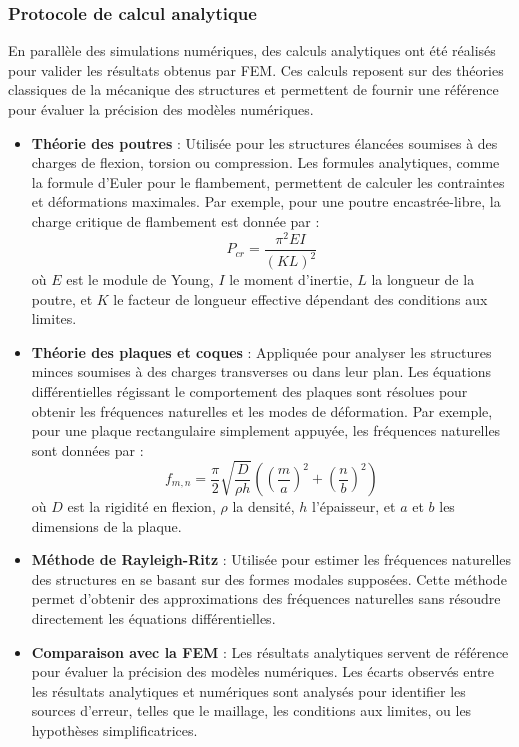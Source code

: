 \subsubsection{Protocole de calcul analytique}

En parallèle des simulations numériques, des calculs analytiques ont été réalisés pour 
valider les résultats obtenus par \acrshort{FEM}. Ces calculs reposent sur des théories 
classiques de la mécanique des structures et permettent de fournir une référence pour 
évaluer la précision des modèles numériques.

\begin{itemize}
    \item \textbf{Théorie des poutres} :
    Utilisée pour les structures élancées soumises à des charges de flexion, torsion ou 
    compression. Les formules analytiques, comme la formule d'Euler pour le flambement, 
    permettent de calculer les contraintes et déformations maximales. Par exemple, pour 
    une poutre encastrée-libre, la charge critique de flambement est donnée par :
    \[
    P_{cr} = \frac{\pi^2 E I}{(K L)^2}
    \]
    où \(E\) est le module de Young, \(I\) le moment d'inertie, \(L\) la longueur de la 
    poutre, et \(K\) le facteur de longueur effective dépendant des conditions aux 
    limites.

    \item \textbf{Théorie des plaques et coques} :
    Appliquée pour analyser les structures minces soumises à des charges transverses 
    ou dans leur plan. Les équations différentielles régissant le comportement des 
    plaques sont résolues pour obtenir les fréquences naturelles et les modes de 
    déformation. Par exemple, pour une plaque rectangulaire simplement appuyée, les 
    fréquences naturelles sont données par :
    \[
    f_{m,n} = \frac{\pi}{2} \sqrt{\frac{D}{\rho h}} \left( \left( \frac{m}{a} \right)^2
     + \left( \frac{n}{b} \right)^2 \right)
    \]
    où \(D\) est la rigidité en flexion, \(\rho\) la densité, \(h\) l'épaisseur, et
     \(a\) et \(b\) les dimensions de la plaque.

    \item \textbf{Méthode de Rayleigh-Ritz} :
    Utilisée pour estimer les fréquences naturelles des structures en se basant sur 
    des formes modales supposées. Cette méthode permet d'obtenir des approximations 
    des fréquences naturelles sans résoudre directement les équations différentielles.

    \item \textbf{Comparaison avec la \acrshort{FEM}} :
    Les résultats analytiques servent de référence pour évaluer la précision des modèles
     numériques. Les écarts observés entre les résultats analytiques et numériques sont 
     analysés pour identifier les sources d'erreur, telles que le maillage, les conditions
      aux limites, ou les hypothèses simplificatrices.
\end{itemize}


